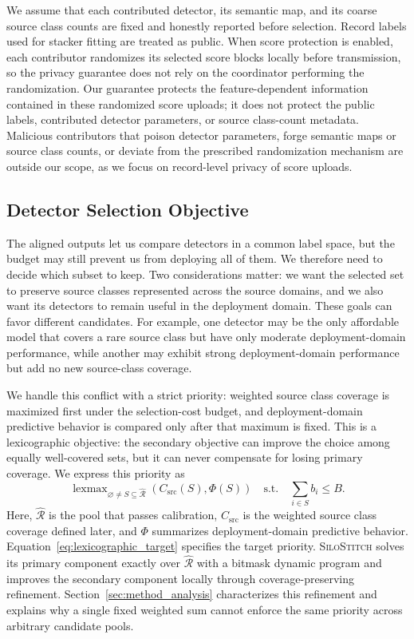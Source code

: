 \documentclass[conference]{IEEEtran}
\theoremstyle{definition}
\newcommand{\Fname}{\textsc{SiloStitch}\xspace}
\begin{document}
We assume that each contributed detector, its semantic map, and its coarse
source class counts are fixed and honestly reported before selection.
Record labels used for stacker fitting are treated as public.
When score protection is enabled, each contributor randomizes its selected score blocks locally before transmission, so the privacy guarantee does not rely on the coordinator performing the randomization.
Our guarantee protects the feature-dependent information contained in these
randomized score uploads; it does not protect the public labels, contributed
detector parameters, or source class-count metadata.
Malicious contributors that poison detector parameters, forge semantic maps or source class counts, or deviate from the prescribed randomization mechanism are outside our scope, as we focus on record-level privacy of score uploads.

\subsection{Detector Selection Objective}

The aligned outputs let us compare detectors in a common label space, but the budget may still prevent us from deploying all of them.
We therefore need to decide which subset to keep.
Two considerations matter: we want the selected set to preserve source classes represented across the source domains, and we also want its detectors to remain useful in the deployment domain.
These goals can favor different candidates.
For example, one detector may be the only affordable model that covers a rare source class but have only moderate deployment-domain performance, while another may exhibit strong deployment-domain performance but add no new source-class coverage.

We handle this conflict with a strict priority: weighted source class coverage is maximized first under the selection-cost budget, and deployment-domain predictive behavior is compared only after that maximum is fixed.
This is a lexicographic objective: the secondary objective can improve the choice among equally well-covered sets, but it can never compensate for losing primary coverage.
We express this priority as
\begin{equation}
\operatorname{lexmax}_{\varnothing\ne S\subseteq\widehat{\mathcal R}}
\left(C_{\mathrm{src}}(S),\Phi(S)\right)
\quad\text{s.t.}\quad
\sum_{i\in S}b_i\le B.
\label{eq:lexicographic_target}
\end{equation}
Here, $\widehat{\mathcal R}$ is the pool that passes calibration, $C_{\mathrm{src}}$ is the weighted source class coverage defined later, and $\Phi$ summarizes deployment-domain predictive behavior.
Equation~\ref{eq:lexicographic_target} specifies the target priority. \Fname solves its primary component exactly over $\widehat{\mathcal R}$ with a bitmask dynamic program and improves the secondary component locally through coverage-preserving refinement.
Section~\ref{sec:method_analysis} characterizes this refinement and explains why a single fixed weighted sum cannot enforce the same priority across arbitrary candidate pools.
\end{document}
